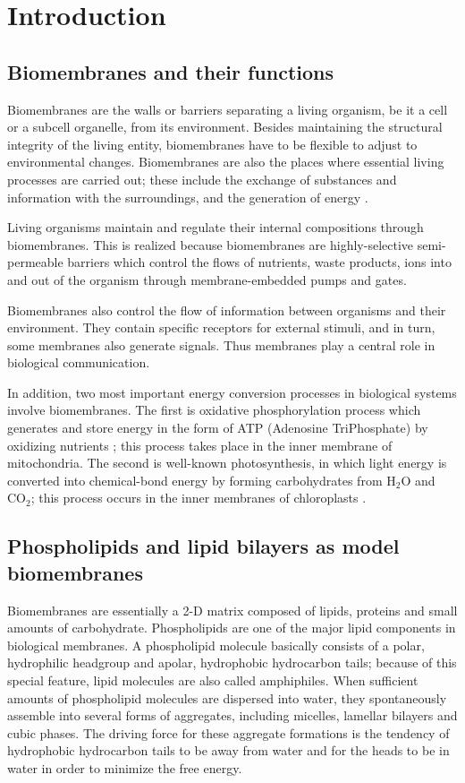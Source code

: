\chapter{Introduction}
\label{intro_chap}

\section{Biomembranes and their functions}
\label{intro_chap_biom}

Biomembranes are the walls or barriers separating a living organism,
be it a cell or a subcell organelle, from its environment. Besides
maintaining the structural integrity of the living entity, biomembranes
have to be flexible to adjust to environmental changes. Biomembranes
are also the places where essential living processes are carried out;
these include the exchange of substances and information with the
surroundings, and the generation of energy \cite{Voet90}.

Living organisms maintain and regulate their internal compositions
through biomembranes. This is realized because biomembranes are
highly-selective semi-permeable barriers which control the flows of
nutrients, waste products, ions into and out of the organism
through membrane-embedded pumps and gates.

Biomembranes also control the flow of information between organisms and 
their environment. They contain specific receptors
for external stimuli, and in turn, some membranes also generate
signals. Thus membranes play a central role in biological
communication.

In addition, two most important energy conversion processes in
biological systems involve biomembranes.
The first is oxidative phosphorylation process which generates
and store energy in the form of ATP (Adenosine TriPhosphate) by oxidizing
nutrients \cite{Voet90}; this process takes place in the inner membrane of
mitochondria.  The second is well-known photosynthesis, in which 
light energy is converted into chemical-bond energy by forming 
carbohydrates from H$_2$O and CO$_2$; this process occurs in the inner 
membranes of chloroplasts \cite{Voet90}.

\section{Phospholipids and lipid bilayers as model biomembranes}

Biomembranes are essentially a 2-D matrix composed of lipids, proteins and 
small amounts of carbohydrate. Phospholipids are one of the major lipid 
components in biological membranes. A phospholipid molecule basically
consists of a polar, hydrophilic headgroup and apolar, hydrophobic
hydrocarbon tails; because of this special feature, lipid molecules
are also called amphiphiles. When sufficient amounts of phospholipid
molecules are dispersed into water, they spontaneously assemble into 
several forms of aggregates, including micelles, lamellar bilayers
and cubic phases. The driving force for these aggregate formations
is the tendency of hydrophobic hydrocarbon tails to be away from water
and for the heads to be in water in order to minimize the free energy.

